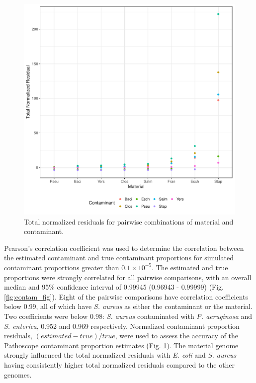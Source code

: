 \documentclass[fleqn,10pt,lineno]{wlpeerj}\usepackage[]{graphicx}\usepackage[]{color}
\makeatletter
\def\maxwidth{ %
  \ifdim\Gin@nat@width>\linewidth
    \linewidth
  \else
    \Gin@nat@width
  \fi
}
\newenvironment{knitrout}{}{} %
\makeatother
\begin{document}
\begin{knitrout}
\color{fgcolor}\begin{figure}
\includegraphics[width=\maxwidth]{figure/contam_resid-1} \caption[Total normalized residuals for pairwise combinations of material and contaminant]{Total normalized residuals for pairwise combinations of material and contaminant.}\label{fig:contam_resid}
\end{figure}


\end{knitrout}


Pearson's correlation coefficient was used to determine the correlation between the estimated contaminant and true contaminant proportions for simulated contaminant proportions greater than $0.1 \times 10^{-5}$. 
The estimated and true proportions were strongly correlated for all pairwise comparisons, with an overall median and 95\% confidence interval of 0.99945 (0.96943 - 0.99999) (Fig. \ref{fig:contam_fig}). 
Eight of the pairwise comparisons have correlation coefficients below 0.99, all of which have \textit{S. aureus} as either the contaminant or the material. 
Two coefficients were below 0.98: \textit{S. aureus} contaminated with \textit{P. aeruginosa} and \textit{S. enterica}, 0.952 and 0.969 respectively. 
Normalized contaminant proportion residuals, $(estimated-true)/true$, were used to assess the accuracy of the Pathoscope contaminant proportion estimates (Fig. \ref{fig:contam_resid}). 
The material genome strongly influenced the total normalized residuals with \textit{E. coli} and \textit{S. aureus} having consistently higher total normalized residuals compared to the other genomes. 
\end{document}
